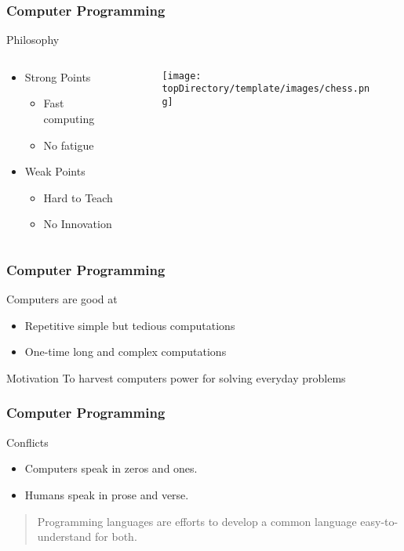 \documentclass[10pt, compress]{beamer}
\begin{document}
\begin{frame}[fragile]
	\frametitle{Computer Programming}
	\begin{block}{Philosophy}
		\begin{columns}
			\begin{column}{0.4\textwidth}
			\begin{itemize}
				\item[] Strong Points
				\begin{itemize}
					\item[] Fast computing
					\item[] No fatigue
				\end{itemize}
				\item[] Weak Points
				\begin{itemize}
					\item[] Hard to Teach
					\item[] No Innovation
				\end{itemize}
			\end{itemize}
			\end{column}
			\begin{column}{0.6\textwidth}
			\begin{figure}[H]\centering
				\texttt{[image: \\topDirectory/template/images/chess.png]}
			\end{figure}
			\end{column}
		\end{columns}
	\end{block}
\end{frame}

\begin{frame}[fragile]
	\frametitle{Computer Programming}
	\begin{block}{Computers are good at}
		\begin{itemize}
			\item[] Repetitive simple but tedious computations
			\item[] One-time long and complex computations
		\end{itemize}
	\end{block}
	\begin{block}{Motivation}
		To harvest computers power for solving everyday problems
	\end{block}
\end{frame}

\begin{frame}[fragile]
	\frametitle{Computer Programming}
	\begin{block}{Conflicts}
			\begin{itemize}
				\item[] Computers speak in zeros and ones.
				\item[] Humans speak in prose and verse.
			\end{itemize}
	\end{block}
	\begin{quote}
		Programming languages are efforts to develop a common language easy-to-understand for both.
	\end{quote}
\end{frame}
\end{document}
